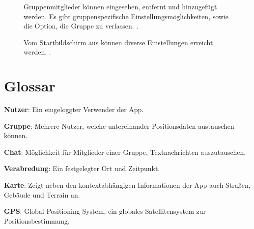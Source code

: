 \documentclass[parskip=full,11pt]{scrartcl}
\begin{document}
\begin{figure}[hb]
		\caption{\label{fig:map}
			Gruppenmitglieder können eingesehen, entfernt und hinzugefügt werden.
			Es gibt gruppenspezifische Einstellungsmöglichkeiten, sowie die Option,
			die Gruppe zu verlassen.
			.
		}
\end{figure}

\begin{figure}[hb]
		\caption{\label{fig:map}
			Vom Startbildschirm aus können diverse Einstellungen erreicht werden.
			.
		}
\end{figure}

\section{Glossar}

\textbf{Nutzer}:
Ein eingeloggter Verwender der App.

\textbf{Gruppe}:
Mehrere Nutzer, welche untereinander Positionsdaten austauschen können.

\textbf{Chat}:
Möglichkeit für Mitglieder einer Gruppe, Textnachrichten auszutauschen.

\textbf{Verabredung}:
Ein festgelegter Ort und Zeitpunkt.

\textbf{Karte}:
Zeigt neben den kontextabhängigen Informationen der App auch Straßen, Gebäude und Terrain an.

\textbf{GPS}:
Global Positioning System, ein globales Satellitensystem zur Positionsbestimmung.
\end{document}

